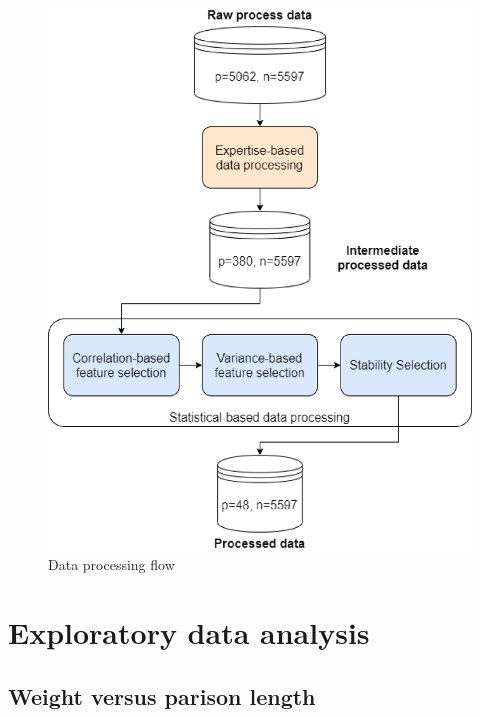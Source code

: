 \begin{figure}
\centerline{\includegraphics[scale=0.7]{images/chapter_3/Data_processing.eps}}
\caption{Data processing flow}
\label{fig:data_processing}
\end{figure}
%

\section{Exploratory data analysis}

\subsection{Weight versus parison length}

